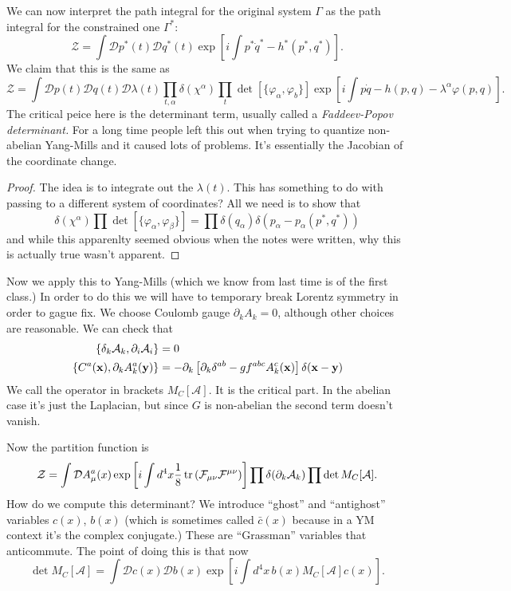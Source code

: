 
We can now interpret the path integral for the original system $\Gamma$ as the path integral for the constrained one $\Gamma^*$:
\[
\mathcal Z = \int \mathcal D p^*(t) \mathcal D q^* (t) \exp \left[ i \int p^* \dot q^* - h^*(p^*,q^*)\right].
\]
We claim that this is the same as
\[
\mathcal Z = \int \mathcal D p(t) \mathcal D q(t) \mathcal D \lambda(t) \prod_{t, \alpha} \delta(\chi^\alpha) \prod_t \det \left[\{ \varphi_\alpha , \varphi_b\} \right] \exp \left[ i \int p \dot q - h(p,q) - \lambda^\alpha \varphi(p,q) \right].
\]
The critical peice here is the determinant term, usually called a \emph{Faddeev-Popov determinant.}
For a long time people left this out when trying to quantize non-abelian Yang-Mills and it caused lots of problems.
It's essentially the Jacobian of the coordinate change.

\begin{proof}
The idea is to integrate out the $\lambda(t)$.
This has something to do with passing to a different system of coordinates?
All we need is to show that
\[
\delta(\chi^\alpha)\prod \det[\{\varphi_\alpha,\varphi_\beta\}] = \prod \delta(q_\alpha) \delta(p_\alpha - p_\alpha(p^*,q^*))
\]
and while this apparenlty seemed obvious when the notes were written, why this is actually true wasn't apparent. 
\end{proof}

Now we apply this to Yang-Mills (which we know from last time is of the first class.)
In order to do this we will have to temporary break Lorentz symmetry in order to gague fix.
We choose Coulomb gauge $\partial_k A_k = 0$, although other choices are reasonable.
We can check that
\begin{align*}
\{ \delta_k \mathcal A_k, \partial_i \mathcal A_i\} &= 0\\
\{C^a(\mathbf{x}), \partial_k A_k^a(\mathbf{y}) \} &= - \partial_k \left[\partial_k \delta^{ab} - g f^{abc} A^c_k(\mathbf{x}) \right]\delta(\mathbf{x} - \mathbf{y})
\end{align*}
We call the operator in brackets  $M_C[\mathcal A]$.
It is the critical part.
In the abelian case it's just the Laplacian, but since $G$ is non-abelian the second term doesn't vanish.

Now the partition function is
\[
\mathcal Z = \int \mathcal D A_\mu^a(x) \exp \left[ i \int d^4x \frac{1}{8} \operatorname{tr}\left(\mathcal F_{\mu \nu} \mathcal F^{\mu \nu}\right )\right]\prod \delta(\partial_k \mathcal A_k) \prod \det M_C[\mathcal A].
\]
How do we compute this determinant?
We introduce ``ghost'' and ``antighost'' variables $c(x)$, $b(x)$ (which is sometimes called $\bar c(x)$ because in a YM context it's the complex conjugate.)
These are ``Grassman'' variables that anticommute.
The point of doing this is that now
\[
\det M_C[\mathcal A] = \int \mathcal D c(x) \mathcal D b(x) \exp \left[ i \int d^4x\, b(x) M_C[\mathcal A]c(x) \right].
\]

